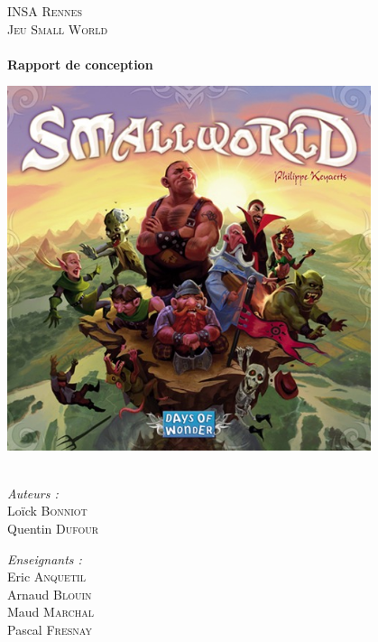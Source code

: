 \begin{titlepage}
\begin{center}


\textsc{\LARGE INSA Rennes}\\[1.5cm]

\textsc{\Large Jeu Small World}\\[0.5cm]

\HRule \\[0.4cm]
{ \huge \bfseries Rapport de conception \\[0.4cm] }

\includegraphics[width=0.8\textwidth]{./images/smallworld.jpg}~\\[1cm]


\HRule \\[1.5cm]

\begin{minipage}{0.4\textwidth}
\begin{flushleft} \large
\emph{Auteurs :}\\
Loïck \textsc{Bonniot}\\
Quentin \textsc{Dufour}\\
\end{flushleft}
\end{minipage}
\begin{minipage}{0.4\textwidth}
\begin{flushright} \large
\emph{Enseignants :} \\
Eric \textsc{Anquetil}\\
Arnaud \textsc{Blouin}\\
Maud \textsc{Marchal}\\
Pascal \textsc{Fresnay}\\
\end{flushright}
\end{minipage}

\vfill


\end{center}
\end{titlepage}
